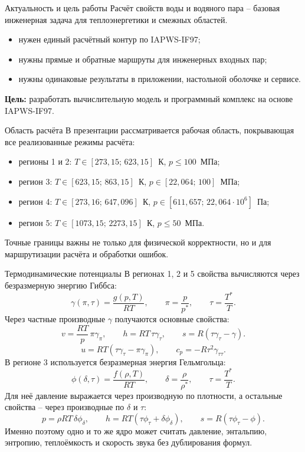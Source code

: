



\begin{frame}[plain]
  \titlepage
\end{frame}

\begin{frame}[t]{Актуальность и цель работы}
\small
Расчёт свойств воды и водяного пара -- базовая инженерная задача для теплоэнергетики и смежных областей.
\begin{itemize}
  \item нужен единый расчётный контур по IAPWS-IF97;
  \item нужны прямые и обратные маршруты для инженерных входных пар;
  \item нужны одинаковые результаты в приложении, настольной оболочке и сервисе.
\end{itemize}
\textbf{Цель:} разработать вычислительную модель и программный комплекс на основе IAPWS-IF97.
\end{frame}

\begin{frame}[t]{Область расчёта}
\small
В презентации рассматривается рабочая область, покрывающая все реализованные режимы расчёта:
\begin{itemize}
  \item регионы 1 и 2: $T \in [273{,}15;\,623{,}15]$~К, $p \le 100$~МПа;
  \item регион 3: $T \in [623{,}15;\,863{,}15]$~К, $p \in [22{,}064;\,100]$~МПа;
  \item регион 4: $T \in [273{,}16;\,647{,}096]$~К, $p \in [611{,}657;\,22{,}064\cdot 10^{6}]$~Па;
  \item регион 5: $T \in [1073{,}15;\,2273{,}15]$~К, $p \le 50$~МПа.
\end{itemize}
Точные границы важны не только для физической корректности, но и для маршрутизации расчёта и обработки ошибок.
\end{frame}

\begin{frame}[t]{Термодинамические потенциалы}
\small
В регионах 1, 2 и 5 свойства вычисляются через безразмерную энергию Гиббса:
\[
\gamma(\pi,\tau)=\frac{g(p,T)}{RT}, \qquad
\pi=\frac{p}{p^{*}}, \qquad
\tau=\frac{T^{*}}{T}.
\]
Через частные производные \(\gamma\) получаются основные свойства:
\[
v=\frac{RT}{p}\,\pi\gamma_{\pi}, \qquad
h=RT\,\tau\gamma_{\tau}, \qquad
s=R(\tau\gamma_{\tau}-\gamma).
\]
\[
u=RT(\tau\gamma_{\tau}-\pi\gamma_{\pi}), \qquad
c_p=-R\tau^2\gamma_{\tau\tau}.
\]
В регионе 3 используется безразмерная энергия Гельмгольца:
\[
\phi(\delta,\tau)=\frac{f(\rho,T)}{RT}, \qquad
\delta=\frac{\rho}{\rho^{*}}, \qquad
\tau=\frac{T^{*}}{T}.
\]
Для неё давление выражается через производную по плотности, а остальные свойства -- через производные по \(\delta\) и \(\tau\):
\[
p=\rho RT\,\delta\phi_{\delta}, \qquad
h=RT(\tau\phi_{\tau}+\delta\phi_{\delta}), \qquad
s=R(\tau\phi_{\tau}-\phi).
\]
Именно поэтому одно и то же ядро может считать давление, энтальпию, энтропию, теплоёмкость и скорость звука без дублирования формул.
\end{frame}


